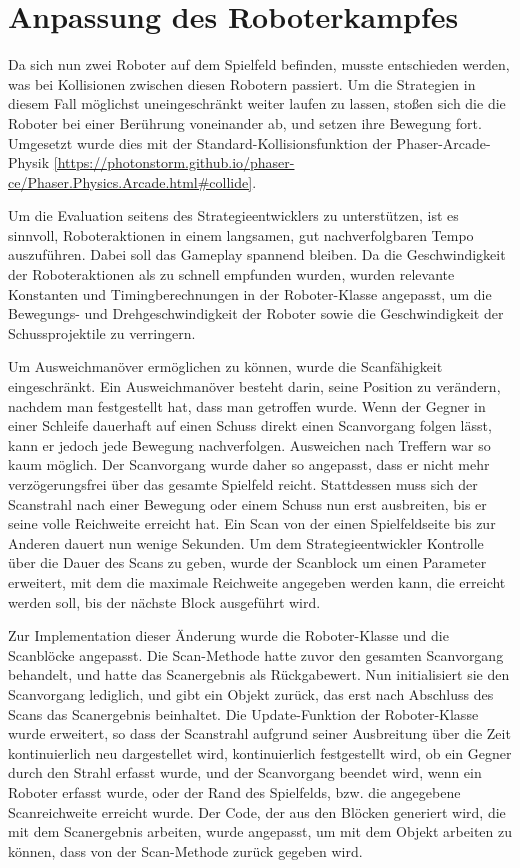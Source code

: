 \section{Anpassung des Roboterkampfes}

Da sich nun zwei Roboter auf dem Spielfeld befinden, musste entschieden werden, was bei Kollisionen
zwischen diesen Robotern passiert. Um die Strategien in diesem Fall möglichst uneingeschränkt weiter
laufen zu lassen, stoßen sich die die Roboter bei einer Berührung voneinander ab, und setzen ihre
Bewegung fort. Umgesetzt wurde dies mit der Standard-Kollisionsfunktion der Phaser-Arcade-Physik
\ref{https://photonstorm.github.io/phaser-ce/Phaser.Physics.Arcade.html#collide}.

Um die Evaluation seitens des Strategieentwicklers zu unterstützen, ist es sinnvoll, Roboteraktionen
in einem langsamen, gut nachverfolgbaren Tempo auszuführen. Dabei soll das Gameplay spannend
bleiben. Da die Geschwindigkeit der Roboteraktionen als zu schnell empfunden wurden, wurden
relevante Konstanten und Timingberechnungen in der Roboter-Klasse angepasst, um die Bewegungs- und
Drehgeschwindigkeit der Roboter sowie die Geschwindigkeit der Schussprojektile zu verringern.

Um Ausweichmanöver ermöglichen zu können, wurde die Scanfähigkeit eingeschränkt. Ein Ausweichmanöver
besteht darin, seine Position zu verändern, nachdem man festgestellt hat, dass man getroffen wurde.
Wenn der Gegner in einer Schleife dauerhaft auf einen Schuss direkt einen Scanvorgang folgen lässt,
kann er jedoch jede Bewegung nachverfolgen. Ausweichen nach Treffern war so kaum möglich. Der
Scanvorgang wurde daher so angepasst, dass er nicht mehr verzögerungsfrei über das gesamte
Spielfeld reicht. Stattdessen muss sich der Scanstrahl nach einer Bewegung oder einem Schuss nun
erst ausbreiten, bis er seine volle Reichweite erreicht hat. Ein Scan von der einen Spielfeldseite
bis zur Anderen dauert nun wenige Sekunden. Um dem Strategieentwickler Kontrolle über die Dauer des Scans
zu geben, wurde der Scanblock um einen Parameter erweitert, mit dem die maximale Reichweite
angegeben werden kann, die erreicht werden soll, bis der nächste Block ausgeführt wird.

Zur Implementation dieser Änderung wurde die Roboter-Klasse und die Scanblöcke angepasst. Die
Scan-Methode hatte zuvor den gesamten Scanvorgang behandelt, und hatte das Scanergebnis als
Rückgabewert. Nun initialisiert sie den Scanvorgang lediglich, und gibt ein Objekt zurück, das erst
nach Abschluss des Scans das Scanergebnis beinhaltet. Die Update-Funktion der Roboter-Klasse wurde
erweitert, so dass der Scanstrahl aufgrund seiner Ausbreitung über die Zeit kontinuierlich neu
dargestellet wird, kontinuierlich festgestellt wird, ob ein Gegner durch den Strahl erfasst wurde,
und der Scanvorgang beendet wird, wenn ein Roboter erfasst wurde, oder der Rand des Spielfelds, bzw.
die angegebene Scanreichweite erreicht wurde. Der Code, der aus den Blöcken generiert wird, die mit
dem Scanergebnis arbeiten, wurde angepasst, um mit dem Objekt arbeiten zu können, dass von der
Scan-Methode zurück gegeben wird.


